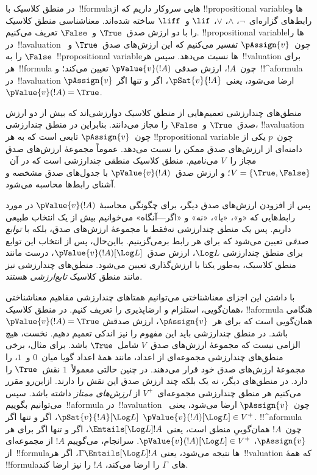 \documentclass[../../../include/open-logic-section]{subfiles}
\begin{document}


در منطق کلاسیک با~!!{formula}هایی سروکار داریم که از
!!{propositional variable}ها و رابط‌های گزاره‌ای~$\lnot$، $\land$،
$\lor$، $\lif$ و~$\liff$ ساخته شده‌اند. معناشناسی منطق کلاسیک را با دو
ارزش صدق~$\True$ و~$\False$ تعریف می‌کنیم. !!{propositional variable}ها
را در~!!a{valuation} چون~$\pAssign{v}$ تفسیر می‌کنیم که این ارزش‌های
صدق~$\True$ و~$\False$ را به~!!{propositional variable}ها نسبت می‌دهد.
سپس هر~!!{valuation} برای هر~!!{formula} چون~$!A$، ارزش صدقی
$\pValue{v}(!A)$ تعیین می‌کند؛ و~!!^a{formula} در~!!a{valuation}
$\pAssign{v}$ ارضا می‌شود، یعنی~$\pSat{v}{!A}$، اگر و تنها اگر
$\pValue{v}(!A) = \True$.

منطق‌های چندارزشی تعمیم‌هایی از منطق کلاسیک دوارزشی‌اند که بیش از دو
ارزش صدق~$\True$ و~$\False$ را مجاز می‌دانند. بنابراین در منطق
چندارزشی، !!a{valuation} چون~$\pAssign{v}$ تابعی است که به هر
!!{propositional variable} چون~$p$ یکی از دامنه‌ای از ارزش‌های صدق ممکن
را نسبت می‌دهد. عموماً مجموعهٔ ارزش‌های صدق مجاز را~$V$ می‌نامیم. منطق
کلاسیک منطقی چندارزشی است که در آن~$V = \{\True, \False\}$؛ و ارزش
صدق~$\pValue{v}(!A)$ با جدول‌های صدق مشخصه و آشنای رابط‌ها محاسبه
می‌شود.

پس از افزودن ارزش‌های صدق دیگر، برای چگونگی محاسبهٔ
$\pValue{v}(!A)$ در مورد رابط‌هایی که «و»، «یا»، «نه» و «اگر---آنگاه»
می‌خوانیم بیش از یک انتخاب طبیعی داریم. پس یک منطق چندارزشی نه‌فقط با
مجموعهٔ ارزش‌های صدق، بلکه با \emph{توابع صدق}ی تعیین می‌شود که برای هر
رابط برمی‌گزینیم. بااین‌حال، پس از انتخاب این توابع برای منطق چندارزشی
$\Log L$، ارزش صدق~$\pValue{v}(!A)[\Log L]$، درست مانند منطق کلاسیک،
به‌طور یکتا با ارزش‌گذاری تعیین می‌شود. منطق‌های چندارزشی نیز مانند
منطق کلاسیک \emph{تابع‌ارزشی} هستند.

با داشتن این اجزای معناشناختی می‌توانیم همتاهای چندارزشی مفاهیم
معناشناختی همان‌گویی، استلزام و ارضاپذیری را تعریف کنیم. در منطق کلاسیک،
!!a{formula} هنگامی همان‌گویی است که برای هر~$\pAssign{v}$، ارزش صدقش
$\pValue{v}(!A) = \True$ باشد. در منطق چندارزشی باید این مفهوم را نیز
اندکی تعمیم دهیم. نخست، هیچ الزامی نیست که مجموعهٔ ارزش‌های صدق~$V$
شامل~$\True$ باشد. برای مثال، برخی منطق‌های چندارزشی مجموعه‌ای از اعداد،
مانند همهٔ اعداد گویا میان~$0$ و~$1$، را مجموعهٔ ارزش‌های صدق خود قرار
می‌دهند. در چنین حالتی معمولاً~$1$ نقش~$\True$ را دارد. در منطق‌های
دیگر، نه یک بلکه چند ارزش صدق این نقش را دارند. ازاین‌رو مقرر می‌کنیم
هر منطق چندارزشی مجموعه‌ای~$V^+$ از \emph{ارزش‌های ممتاز} داشته باشد.
سپس می‌توانیم بگوییم~!!a{formula} در~!!a{valuation} چون~$\pAssign{v}$
ارضا می‌شود، یعنی~$\pSat{v}{!A}[\Log L]$، اگر و تنها اگر
$\pValue{v}(!A)[\Log L] \in V^+$. !!^a{formula} چون~$!A$ همان‌گوییِ
منطق است، یعنی~$\Entails[\Log L] !A$، اگر و تنها اگر برای هر
$\pAssign{v}$، $\pValue{v}(!A)[\Log L] \in V^+$. سرانجام، می‌گوییم
$!A$ از مجموعه‌ای از~!!{formula}ها نتیجه می‌شود، یعنی
$\Gamma \Entails[\Log L] !A$، اگر هر~!!{valuation} که همهٔ
!!{formula}های~$\Gamma$ را ارضا می‌کند، $!A$ را نیز ارضا کند.
\end{document}
